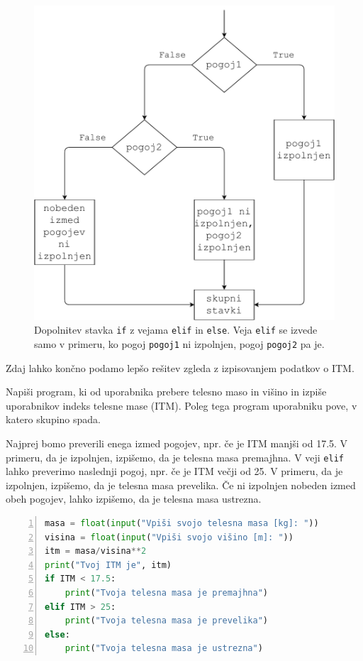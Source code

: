 \begin{figure}
    \centering
    \includegraphics[width=0.65\linewidth]{img/if3.pdf}
    \caption{Dopolnitev stavka \texttt{if} z vejama \texttt{elif} in \texttt{else}. Veja \texttt{elif} se izvede samo v primeru, ko pogoj \texttt{pogoj1} ni izpolnjen, pogoj \texttt{pogoj2} pa je.}
    \label{img:if3}
\end{figure}

Zdaj lahko končno podamo lepšo rešitev zgleda z izpisovanjem podatkov o ITM.
\begin{zgled}
Napiši program, ki od uporabnika prebere telesno maso in višino in izpiše uporabnikov indeks telesne mase (ITM). Poleg tega program uporabniku pove, v katero skupino spada. 
\end{zgled}
\begin{resitev}
Najprej bomo preverili enega izmed pogojev, npr. če je ITM manjši od 17.5. V primeru, da je izpolnjen, izpišemo, da je telesna masa premajhna. V veji \texttt{elif} lahko preverimo naslednji pogoj, npr. če je ITM večji od 25. V primeru, da je izpolnjen, izpišemo, da je telesna masa prevelika. Če ni izpolnjen nobeden izmed obeh pogojev, lahko izpišemo, da je telesna masa ustrezna.
\begin{lstlisting}[language=Python, showstringspaces=false,numbers=left]
masa = float(input("Vpiši svojo telesna masa [kg]: "))
visina = float(input("Vpiši svojo višino [m]: "))
itm = masa/visina**2
print("Tvoj ITM je", itm)
if ITM < 17.5:
    print("Tvoja telesna masa je premajhna")
elif ITM > 25:
    print("Tvoja telesna masa je prevelika")
else:
    print("Tvoja telesna masa je ustrezna")
\end{lstlisting}
\end{resitev}

